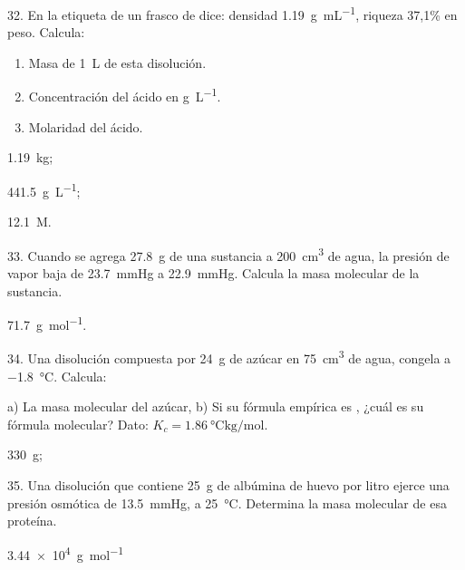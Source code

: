 \documentclass[11pt]{article}
\begin{document}
\begin{multicols}{2}
\begin{exercise}
  32. En la etiqueta de un frasco de  dice: densidad \SI{1.19}{\gram\per\milli\liter}, riqueza 37,1\% en peso. Calcula:
  \begin{enumerate}
    \item Masa de \SI{1}{\liter} de esta disolución.
    \item Concentración del ácido en \si{\gram\per\liter}.
    \item Molaridad del ácido.
  \end{enumerate}
\end{exercise}
\begin{solution}
  \begin{enumerate*}
    \item \SI{1,19}{\kilo\gram};
    \item \SI{441,5}{\gram\per\liter}; %
    \item \SI{12,1}{M}.
  \end{enumerate*}
\end{solution}

\begin{exercise}
  33. Cuando se agrega \SI{27.8}{\gram} de una sustancia a \SI{200}{\cubic\centi\meter} de agua, la presión de vapor baja de \SI{23.7}{\mmHg} a \SI{22.9}{\mmHg}. Calcula la masa molecular de la sustancia.
\end{exercise}
\begin{solution}
  \SI{71.7}{\gram\per\mole}.
\end{solution}

\begin{exercise}
  34. Una disolución compuesta por \SI{24}{\gram} de azúcar en \SI{75}{\cubic\centi\meter} de agua, congela a \SI{-1.8}{\celsius}. Calcula:
  \begin{enumerate}
    a) La masa molecular del azúcar,
    b) Si su fórmula empírica es , ¿cuál es su fórmula molecular? Dato: $K_c = \SI{1.86}{\celsius\kilo\gram\per\mole}$. %
  \end{enumerate}
\end{exercise}
\begin{solution}
  \SI{330}{\gram}; 
\end{solution}

\begin{exercise}
  35. Una disolución que contiene \SI{25}{\gram} de albúmina de
  huevo por litro ejerce una presión osmótica de \SI{13.5}{\mmHg}, a
  \SI{25}{\celsius}. Determina la masa molecular de esa proteína.
\end{exercise}
\begin{solution}
  \SI{3.44e4}{\gram\per\mole}
\end{solution}


\end{multicols}
\end{document}
